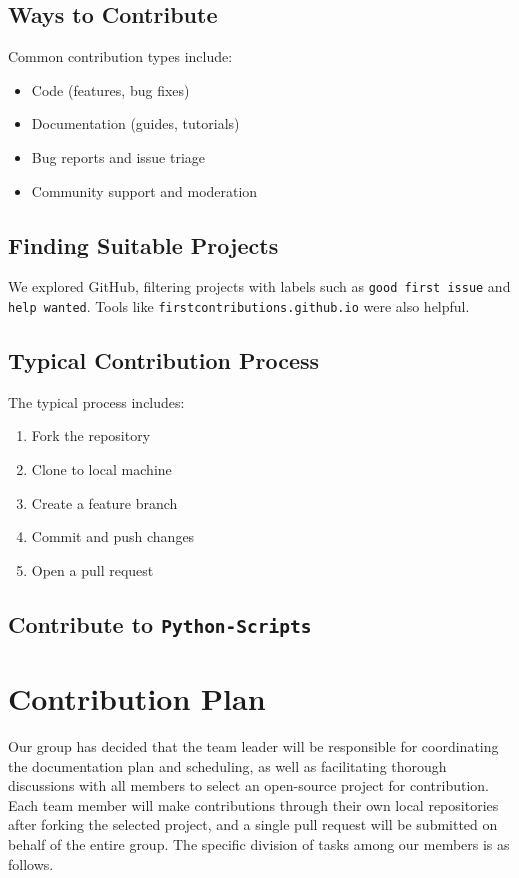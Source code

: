 \documentclass[12pt]{article}
\begin{document}
\subsection{Ways to Contribute}
Common contribution types include:
\begin{itemize}
    \item Code (features, bug fixes)
    \item Documentation (guides, tutorials)
    \item Bug reports and issue triage
    \item Community support and moderation
\end{itemize}

\subsection{Finding Suitable Projects}
We explored GitHub, filtering projects with labels such as \texttt{good first issue} and \texttt{help wanted}. Tools like \texttt{firstcontributions.github.io} were also helpful.

\subsection{Typical Contribution Process}
The typical process includes:
\begin{enumerate}
    \item Fork the repository
    \item Clone to local machine
    \item Create a feature branch
    \item Commit and push changes
    \item Open a pull request
\end{enumerate}

\subsection{Contribute to \texttt{Python-Scripts}}


\section{Contribution Plan}

Our group has decided that the team leader will be responsible for coordinating the documentation plan and scheduling, as well as facilitating thorough discussions with all members to select an open-source project for contribution. Each team member will make contributions through their own local repositories after forking the selected project, and a single pull request will be submitted on behalf of the entire group. The specific division of tasks among our members is as follows.
\end{document}
